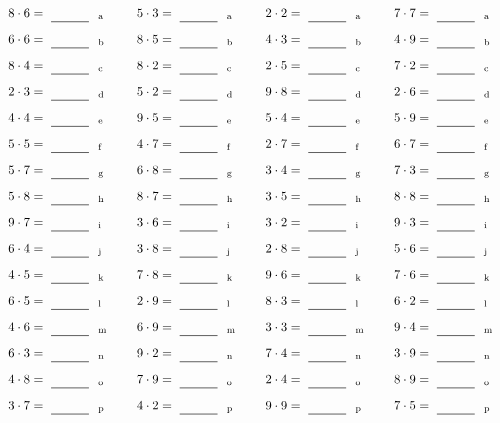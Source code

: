 \documentclass
[
  draft    = true,
  fontsize = 11pt,
  parskip  = half-
]
{scrartcl}
\begin{document}
\par\vfill\par
\begin{align*}
    \pline{8\cdot6}&=\rline{a}
  & \pline{5\cdot3}&=\rline{a}
  & \pline{2\cdot2}&=\rline{a}
  & \pline{7\cdot7}&=\rline{a} \\[1ex]
    \pline{6\cdot6}&=\rline{b}
  & \pline{8\cdot5}&=\rline{b}
  & \pline{4\cdot3}&=\rline{b}
  & \pline{4\cdot9}&=\rline{b} \\[1ex]
    \pline{8\cdot4}&=\rline{c}
  & \pline{8\cdot2}&=\rline{c}
  & \pline{2\cdot5}&=\rline{c}
  & \pline{7\cdot2}&=\rline{c} \\[1ex]
    \pline{2\cdot3}&=\rline{d}
  & \pline{5\cdot2}&=\rline{d}
  & \pline{9\cdot8}&=\rline{d}
  & \pline{2\cdot6}&=\rline{d} \\[1ex]
    \pline{4\cdot4}&=\rline{e}
  & \pline{9\cdot5}&=\rline{e}
  & \pline{5\cdot4}&=\rline{e}
  & \pline{5\cdot9}&=\rline{e} \\[1ex]
    \pline{5\cdot5}&=\rline{f}
  & \pline{4\cdot7}&=\rline{f}
  & \pline{2\cdot7}&=\rline{f}
  & \pline{6\cdot7}&=\rline{f} \\[1ex]
    \pline{5\cdot7}&=\rline{g}
  & \pline{6\cdot8}&=\rline{g}
  & \pline{3\cdot4}&=\rline{g}
  & \pline{7\cdot3}&=\rline{g} \\[1ex]
    \pline{5\cdot8}&=\rline{h}
  & \pline{8\cdot7}&=\rline{h}
  & \pline{3\cdot5}&=\rline{h}
  & \pline{8\cdot8}&=\rline{h} \\[1ex]
    \pline{9\cdot7}&=\rline{i}
  & \pline{3\cdot6}&=\rline{i}
  & \pline{3\cdot2}&=\rline{i}
  & \pline{9\cdot3}&=\rline{i} \\[1ex]
    \pline{6\cdot4}&=\rline{j}
  & \pline{3\cdot8}&=\rline{j}
  & \pline{2\cdot8}&=\rline{j}
  & \pline{5\cdot6}&=\rline{j} \\[1ex]
    \pline{4\cdot5}&=\rline{k}
  & \pline{7\cdot8}&=\rline{k}
  & \pline{9\cdot6}&=\rline{k}
  & \pline{7\cdot6}&=\rline{k} \\[1ex]
    \pline{6\cdot5}&=\rline{l}
  & \pline{2\cdot9}&=\rline{l}
  & \pline{8\cdot3}&=\rline{l}
  & \pline{6\cdot2}&=\rline{l} \\[1ex]
    \pline{4\cdot6}&=\rline{m}
  & \pline{6\cdot9}&=\rline{m}
  & \pline{3\cdot3}&=\rline{m}
  & \pline{9\cdot4}&=\rline{m} \\[1ex]
    \pline{6\cdot3}&=\rline{n}
  & \pline{9\cdot2}&=\rline{n}
  & \pline{7\cdot4}&=\rline{n}
  & \pline{3\cdot9}&=\rline{n} \\[1ex]
    \pline{4\cdot8}&=\rline{o}
  & \pline{7\cdot9}&=\rline{o}
  & \pline{2\cdot4}&=\rline{o}
  & \pline{8\cdot9}&=\rline{o} \\[1ex]
    \pline{3\cdot7}&=\rline{p}
  & \pline{4\cdot2}&=\rline{p}
  & \pline{9\cdot9}&=\rline{p}
  & \pline{7\cdot5}&=\rline{p}
\end{align*}
\end{document}

